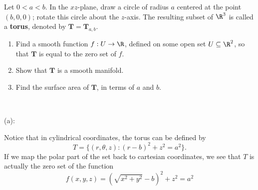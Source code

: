 \documentclass{../../../tex-setup/eh-homework}
\begin{document}
    \begin{question}{41}
        Let $0<a<b$. In the $xz$-plane, draw a circle of radius $a$ centered at the point $(b,0,0)$; rotate this circle about the $z$-axis. The resulting subset of $\R^3$ is called a \textbf{torus}, denoted by $\mathbf{T}=\mathbf{T}_{a,b}$.
        \begin{enumerate}[label=(\alph*)]
            \item Find a smooth function $f:U\rightarrow \R$, defined on some open set $U\subseteq \R^2$, so that $\mathbf{T}$ is equal to the zero set of $f$.
            
            \item Show that $\mathbf{T}$ is a smooth manifold.
            
            \item Find the surface area of $\mathbf{T}$, in terms of $a$ and $b$.
        \end{enumerate}
        \tcblower
        \ 

        (a):

        Notice that in cylindrical coordinates, the torus can be defined by
        \[
            T = \{ (r, \theta, z) : (r - b)^2 + z^2 = a^2\}.
        \]
        If we map the polar part of the set back to cartesian coordinates, we see that \(T\) is actually the zero set of the function
        \[
            f(x,y,z) = (\sqrt{x^2 + y^2} - b)^2 + z^2 = a^2
        \]
    \end{question}
\end{document}
